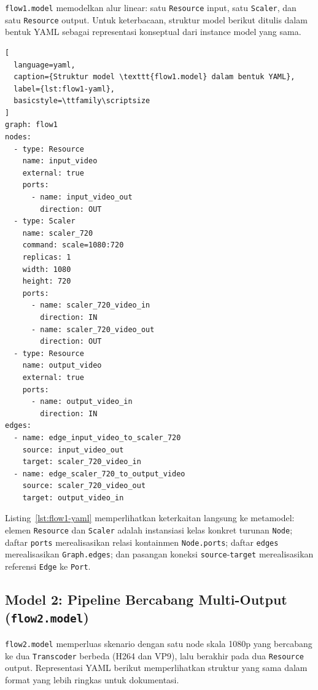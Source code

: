\texttt{flow1.model} memodelkan alur linear: satu \texttt{Resource} input, satu \texttt{Scaler}, dan satu \texttt{Resource} output. Untuk keterbacaan, struktur model berikut ditulis dalam bentuk YAML sebagai representasi konseptual dari instance model yang sama.

\begin{lstlisting}[
  language=yaml,
  caption={Struktur model \texttt{flow1.model} dalam bentuk YAML},
  label={lst:flow1-yaml},
  basicstyle=\ttfamily\scriptsize
]
graph: flow1
nodes:
  - type: Resource
    name: input_video
    external: true
    ports:
      - name: input_video_out
        direction: OUT
  - type: Scaler
    name: scaler_720
    command: scale=1080:720
    replicas: 1
    width: 1080
    height: 720
    ports:
      - name: scaler_720_video_in
        direction: IN
      - name: scaler_720_video_out
        direction: OUT
  - type: Resource
    name: output_video
    external: true
    ports:
      - name: output_video_in
        direction: IN
edges:
  - name: edge_input_video_to_scaler_720
    source: input_video_out
    target: scaler_720_video_in
  - name: edge_scaler_720_to_output_video
    source: scaler_720_video_out
    target: output_video_in
\end{lstlisting}

Listing~\ref{lst:flow1-yaml} memperlihatkan keterkaitan langsung ke metamodel: elemen \texttt{Resource} dan \texttt{Scaler} adalah instansiasi kelas konkret turunan \texttt{Node}; daftar \texttt{ports} merealisasikan relasi kontainmen \texttt{Node.ports}; daftar \texttt{edges} merealisasikan \texttt{Graph.edges}; dan pasangan koneksi \texttt{source}-\texttt{target} merealisasikan referensi \texttt{Edge} ke \texttt{Port}.

\subsection[Model 2: Pipeline Bercabang Multi-Output]{Model 2: Pipeline Bercabang Multi-Output (\texttt{flow2.model})}

\texttt{flow2.model} memperluas skenario dengan satu node skala 1080p yang bercabang ke dua \texttt{Transcoder} berbeda (H264 dan VP9), lalu berakhir pada dua \texttt{Resource} output. Representasi YAML berikut memperlihatkan struktur yang sama dalam format yang lebih ringkas untuk dokumentasi.

